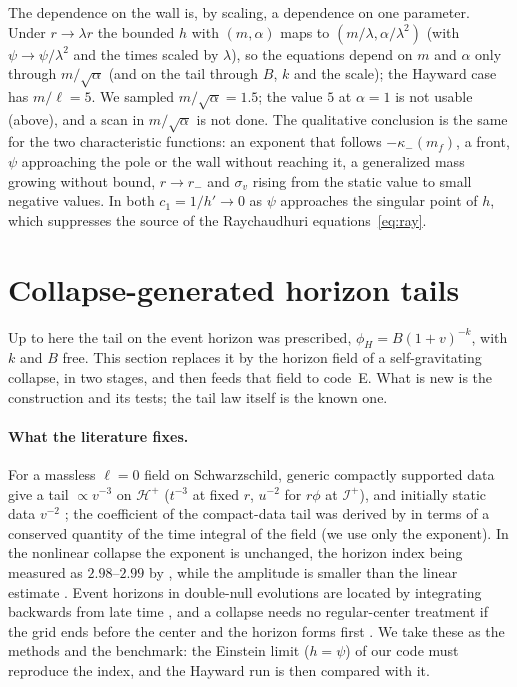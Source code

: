 \documentclass[11pt]{article}
\begin{document}
The dependence on the wall is, by scaling, a dependence on one parameter. Under $r\to\lambda r$ the bounded $h$ with $(m,\alpha)$ maps to $(m/\lambda,\alpha/\lambda^{2})$ (with $\psi\to\psi/\lambda^{2}$ and the times scaled by $\lambda$), so the equations depend on $m$ and $\alpha$ only through $m/\sqrt\alpha$ (and on the tail through $B$, $k$ and the scale); the Hayward case has $m/\ell=5$. We sampled $m/\sqrt\alpha=1.5$; the value $5$ at $\alpha=1$ is not usable (above), and a scan in $m/\sqrt\alpha$ is not done. The qualitative conclusion is the same for the two characteristic functions: an exponent that follows $-\kappa_-(m_f)$, a front, $\psi$ approaching the pole or the wall without reaching it, a generalized mass growing without bound, $r\to r_-$ and $\sigma_v$ rising from the static value to small negative values. In both $c_1=1/h'\to0$ as $\psi$ approaches the singular point of $h$, which suppresses the source of the Raychaudhuri equations~\eqref{eq:ray}.

\section{Collapse-generated horizon tails}
\label{sec:collapse}

Up to here the tail on the event horizon was prescribed, $\phi_H=B(1+v)^{-k}$, with $k$ and $B$ free. This section replaces it by the horizon field of a self-gravitating collapse, in two stages, and then feeds that field to code~E. What is new is the construction and its tests; the tail law itself is the known one.

\paragraph{What the literature fixes.} For a massless $\ell=0$ field on Schwarzschild, generic compactly supported data give a tail $\propto v^{-3}$ on $\mathcal H^{+}$ ($t^{-3}$ at fixed $r$, $u^{-2}$ for $r\phi$ at $\mathcal I^{+}$), and initially static data $v^{-2}$ \citep{Price1972,GundlachPricePullin1994}; the coefficient of the compact-data tail was derived by \citet{AngelopoulosAretakisGajic2018} in terms of a conserved quantity of the time integral of the field (we use only the exponent). In the nonlinear collapse the exponent is unchanged, the horizon index being measured as $2.98$--$2.99$ by \citet{BurkoOri1997b}, while the amplitude is smaller than the linear estimate \citep{GundlachPricePullin1994b}. Event horizons in double-null evolutions are located by integrating backwards from late time \citep{Libson1996,Diener2003}, and a collapse needs no regular-center treatment if the grid ends before the center and the horizon forms first \citep{BurkoOri1997b}. We take these as the methods and the benchmark: the Einstein limit ($h=\psi$) of our code must reproduce the index, and the Hayward run is then compared with it.
\end{document}
